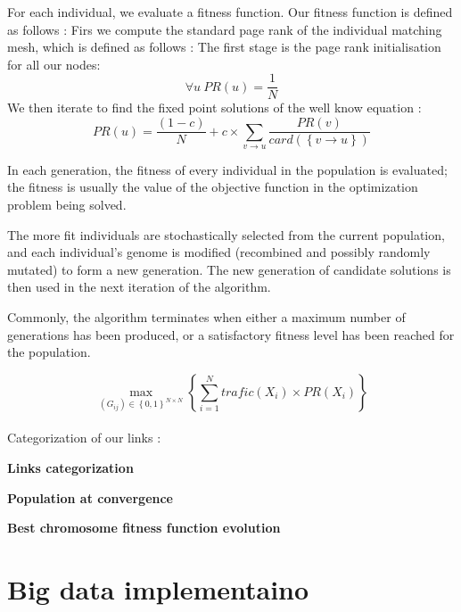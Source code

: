 \documentclass{iSWAGArticle}
\begin{document}
For each individual, we evaluate a fitness function. Our fitness function is defined as follows :
Firs we compute the standard page rank of the individual matching mesh, which is defined as follows :
The first stage is the page rank initialisation for all our nodes:
\begin{equation}
\forall u \ PR\left(u\right)=\frac{1}{N}
\end{equation} 
We then iterate to find the fixed point solutions of the well know equation :
\begin{equation}
PR\left(u\right)= \frac{\left(1-c\right)}{N} + c \times \sum_{v \rightarrow u}\frac{PR\left(v\right)}{card\left(\left\{v\rightarrow u\right\}\right)}
\end{equation}


In each generation, the fitness of every individual in the population is evaluated; 
the fitness is usually the value of the objective function in the optimization problem being solved.
 
 The more fit individuals are stochastically selected from the current population, 
and each individual's genome is modified (recombined and possibly randomly mutated) to form a new generation. 
The new generation of candidate solutions is then used in the next iteration of the algorithm. 


Commonly, the algorithm terminates when either a maximum number of generations has been produced, 
or a satisfactory fitness level has been reached for the population.


\begin{equation}
\max_{\left(G_{ij}\right)  \in \left\{0,1\right\}^{N\times N}}\left\{ \sum^{N}_{i=1} trafic\left(X_i\right)\times PR(X_i)\right\}
\end{equation}
 \\\newline
Categorization of our links :

\textbf{\large Links categorization}
\begin{center}
\end{center}

\textbf{\large Population at convergence}
\begin{center}
\end{center}
\textbf{\large Best chromosome fitness function evolution}
\begin{center}
\end{center}

\section{Big data implementaino}



\end{document}
